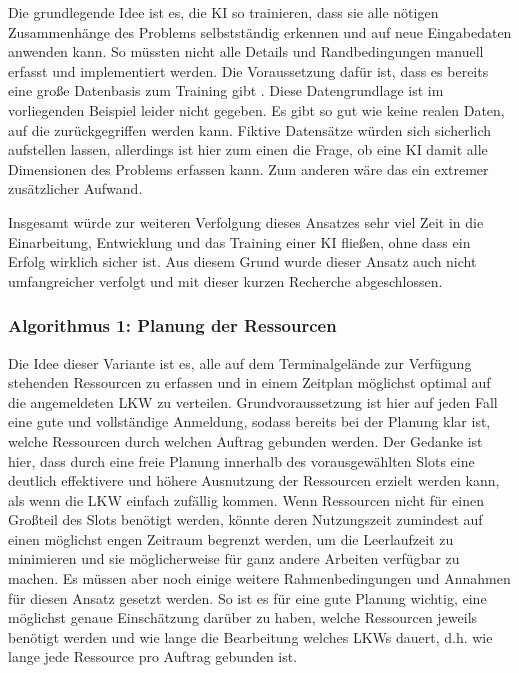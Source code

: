 
Die grundlegende Idee ist es, die KI so trainieren, dass sie alle nötigen Zusammenhänge des Problems selbstständig erkennen und auf neue Eingabedaten anwenden kann. So müssten nicht alle Details und Randbedingungen manuell erfasst und implementiert werden. Die Voraussetzung dafür ist, dass es bereits eine große Datenbasis zum Training gibt \cite{KIverstehen}. Diese Datengrundlage ist im vorliegenden Beispiel leider nicht gegeben. Es gibt so gut wie keine realen Daten, auf die zurückgegriffen werden kann. Fiktive Datensätze würden sich sicherlich aufstellen lassen, allerdings ist hier zum einen die Frage, ob eine KI damit alle Dimensionen des Problems erfassen kann. Zum anderen wäre das ein extremer zusätzlicher Aufwand.

Insgesamt würde zur weiteren Verfolgung dieses Ansatzes sehr viel Zeit in die Einarbeitung, Entwicklung und das Training einer KI fließen, ohne dass ein Erfolg wirklich sicher ist. Aus diesem Grund wurde dieser Ansatz auch nicht umfangreicher verfolgt und mit dieser kurzen Recherche abgeschlossen.

\subsubsection{Algorithmus 1: Planung der Ressourcen}

Die Idee dieser Variante ist es, alle auf dem Terminalgelände zur Verfügung stehenden Ressourcen zu erfassen und in einem Zeitplan möglichst optimal auf die angemeldeten LKW zu verteilen. Grundvoraussetzung ist hier auf jeden Fall eine gute und vollständige Anmeldung, sodass bereits bei der Planung klar ist, welche Ressourcen durch welchen Auftrag gebunden werden. Der Gedanke ist hier, dass durch eine freie Planung innerhalb des vorausgewählten Slots eine deutlich effektivere und höhere Ausnutzung der Ressourcen erzielt werden kann, als wenn die LKW einfach zufällig kommen. Wenn Ressourcen nicht für einen Großteil des Slots benötigt werden, könnte deren Nutzungszeit zumindest auf einen möglichst engen Zeitraum begrenzt werden, um die Leerlaufzeit zu minimieren und sie möglicherweise für ganz andere Arbeiten verfügbar zu machen. Es müssen aber noch einige weitere Rahmenbedingungen und Annahmen für diesen Ansatz gesetzt werden. So ist es für eine gute Planung wichtig, eine möglichst genaue Einschätzung darüber zu haben, welche Ressourcen jeweils benötigt werden und wie lange die Bearbeitung welches LKWs dauert, d.h. wie lange jede Ressource pro Auftrag gebunden ist. 

